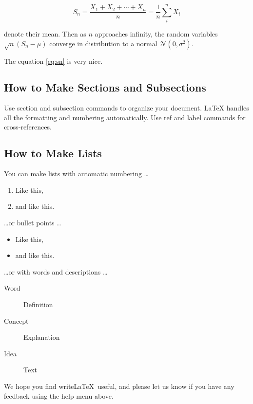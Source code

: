 \documentclass[a4paper]{article}
\begin{document}
\begin{equation}
	S_n = \frac{X_1 + X_2 + \cdots + X_n}{n}
	= \frac{1}{n}\sum_{i}^{n} X_i
	\label{eq:sn}
\end{equation}

denote their mean. Then as $n$ approaches infinity, the random variables $\sqrt{n}(S_n - \mu)$ converge in distribution to a normal $\mathcal{N}(0, \sigma^2)$.

The equation \ref{eq:sn} is very nice.

\subsection{How to Make Sections and Subsections}

Use section and subsection commands to organize your document. \LaTeX{} handles all the formatting and numbering automatically. Use ref and label commands for cross-references.

\subsection{How to Make Lists}

You can make lists with automatic numbering \dots

\begin{enumerate}
	\item Like this,
	\item and like this.
\end{enumerate}
\dots or bullet points \dots
\begin{itemize}
	\item Like this,
	\item and like this.
\end{itemize}
\dots or with words and descriptions \dots
\begin{description}
	\item[Word] Definition
	\item[Concept] Explanation
	\item[Idea] Text
\end{description}

We hope you find write\LaTeX\ useful, and please let us know if you have any feedback using the help menu above.
\end{document}
